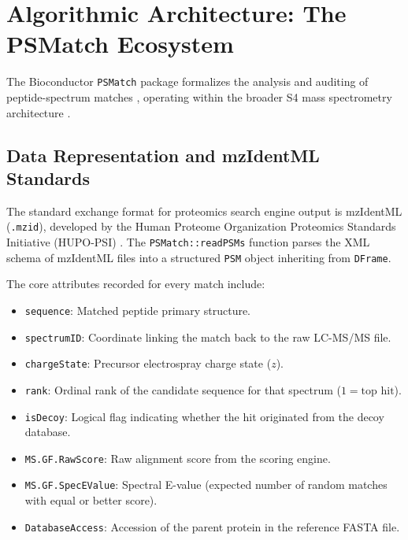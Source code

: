 \documentclass[11pt,twoside,openright]{book}
\begin{document}
\section{Algorithmic Architecture: The PSMatch Ecosystem}

The Bioconductor \texttt{PSMatch} package formalizes the analysis and auditing of peptide-spectrum matches \cite{gatto2023psmatch}, operating within the broader S4 mass spectrometry architecture \cite{huber2015orchestrating, gatto2023qfeatures}.

\subsection{Data Representation and mzIdentML Standards}
The standard exchange format for proteomics search engine output is mzIdentML (\texttt{.mzid}), developed by the Human Proteome Organization Proteomics Standards Initiative (HUPO-PSI) \cite{jones2012mzidentml}. The \texttt{PSMatch::readPSMs} function parses the XML schema of mzIdentML files into a structured \texttt{PSM} object inheriting from \texttt{DFrame}.

The core attributes recorded for every match include:
\begin{itemize}
    \item \texttt{sequence}: Matched peptide primary structure.
    \item \texttt{spectrumID}: Coordinate linking the match back to the raw LC-MS/MS file.
    \item \texttt{chargeState}: Precursor electrospray charge state ($z$).
    \item \texttt{rank}: Ordinal rank of the candidate sequence for that spectrum ($1 = \text{top hit}$).
    \item \texttt{isDecoy}: Logical flag indicating whether the hit originated from the decoy database.
    \item \texttt{MS.GF.RawScore}: Raw alignment score from the scoring engine.
    \item \texttt{MS.GF.SpecEValue}: Spectral E-value (expected number of random matches with equal or better score).
    \item \texttt{DatabaseAccess}: Accession of the parent protein in the reference FASTA file.
\end{itemize}
\end{document}

